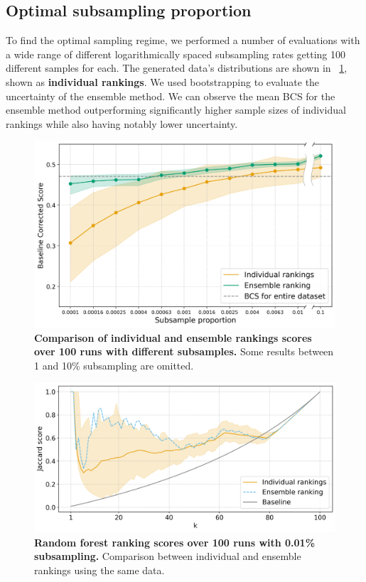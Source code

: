 \documentclass[fleqn,moreauthors,10pt]{ds_report}
\begin{document}
\subsection*{Optimal subsampling proportion}

To find the optimal sampling regime, we performed a number of evaluations with a wide range of different logarithmically spaced subsampling rates getting 100 different samples for each. The generated data's distributions are shown in \figurename~\ref{fig:RF_ensemble_vs_individual}, shown as \textbf{individual rankings}. We used bootstrapping to evaluate the uncertainty of the ensemble method. We can observe the mean BCS for the ensemble method outperforming significantly higher sample sizes of individual rankings while also having notably lower uncertainty.


\begin{figure}[!h]
	\includegraphics[width=\linewidth]{img/RF_bootstrap_results_ensemble_lines_broken_axis.png}
	\caption{\textbf{Comparison of individual and ensemble rankings scores over 100 runs with different subsamples.} Some results between 1 and 10\% subsampling are omitted.}
	\label{fig:RF_ensemble_vs_individual}
\end{figure}


\begin{figure}[!h]
	\includegraphics[width=\linewidth]{img/rf_performance_ensemble_vs_individual.png}
	\caption{\textbf{Random forest ranking scores over 100 runs with 0.01\% subsampling.} Comparison between individual and ensemble rankings using the same data.}
	\label{fig:rf_performance_ensemble_vs_individual}
\end{figure}
\end{document}
